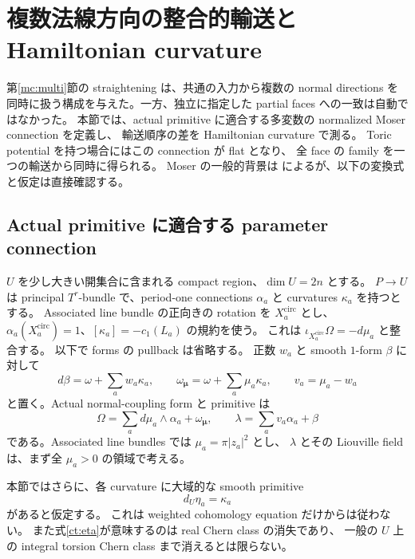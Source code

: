 \section{複数法線方向の整合的輸送と Hamiltonian curvature}
\label{ct:section}

第\ref{mc:multi}節の straightening は、共通の入力から複数の normal directions を
同時に扱う構成を与えた。一方、独立に指定した partial faces への一致は自動ではなかった。
本節では、actual primitive に適合する多変数の normalized Moser connection を定義し、
輸送順序の差を Hamiltonian curvature で測る。
Toric potential を持つ場合にはこの connection が flat となり、
全 face の family を一つの輸送から同時に得られる。
Moser の一般的背景は \cite[Section 7.2]{cds-local} によるが、以下の変換式と仮定は直接確認する。

\subsection{Actual primitive に適合する parameter connection}
\label{ct:connection}

$U$ を少し大きい開集合に含まれる compact region、$\dim U=2n$ とする。
$P\to U$ は principal $T^r$-bundle で、period-one connections $\alpha_a$ と
curvatures $\kappa_a$ を持つとする。
Associated line bundle の正向きの rotation を $X_a^{\mathrm{circ}}$ とし、
$\alpha_a(X_a^{\mathrm{circ}})=1$、$[\kappa_a]=-c_1(L_a)$ の規約を使う。
これは $\iota_{X_a^{\mathrm{circ}}}\Omega=-d\mu_a$ と整合する。
以下で forms の pullback は省略する。
正数 $w_a$ と smooth $1$-form $\beta$ に対して
\[
 d\beta=\omega+\sum_a w_a\kappa_a,
 \qquad
 \omega_{\boldsymbol\mu}=\omega+\sum_a\mu_a\kappa_a,
 \qquad v_a=\mu_a-w_a
\]
と置く。Actual normal-coupling form と primitive は
\begin{equation}\label{ct:actual}
 \Omega=\sum_a d\mu_a\wedge\alpha_a+\omega_{\boldsymbol\mu},
 \qquad
 \lambda=\sum_a v_a\alpha_a+\beta
\end{equation}
である。Associated line bundles では $\mu_a=\pi|z_a|^2$ とし、
$\lambda$ とその Liouville field は、まず全 $\mu_a>0$ の領域で考える。

本節ではさらに、各 curvature に大域的な smooth primitive
\begin{equation}\label{ct:eta}
 d_U\eta_a=\kappa_a
\end{equation}
があると仮定する。
これは weighted cohomology equation だけからは従わない。
また式\eqref{ct:eta}が意味するのは real Chern class の消失であり、
一般の $U$ 上の integral torsion Chern class まで消えるとは限らない。

